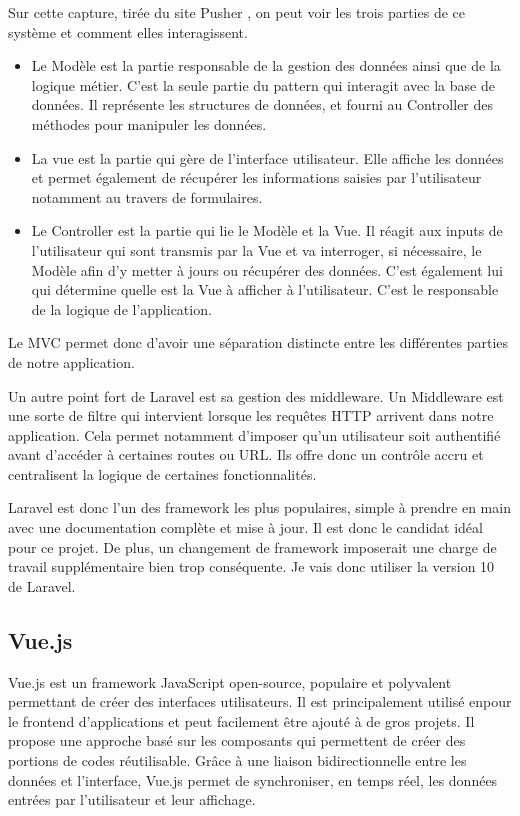 Sur cette capture, tirée du site Pusher \cite{MVC}, on peut voir les trois parties de ce système et comment elles interagissent.
\begin{itemize}
  \item Le Modèle est la partie responsable de la gestion des données ainsi que de la logique métier. C'est la seule partie du pattern qui interagit avec la base de données. Il représente les structures de données, et fourni au Controller des méthodes pour manipuler les données.
  \item La vue est la partie qui gère de l'interface utilisateur. Elle affiche les données et permet également de récupérer les informations saisies par l'utilisateur notamment au travers de formulaires.
  \item Le Controller est la partie qui lie le Modèle et la Vue. Il réagit aux inputs de l'utilisateur qui sont transmis par la Vue et va interroger, si nécessaire, le Modèle afin d'y metter à jours ou récupérer des données. C'est également lui qui détermine quelle est la Vue à afficher à l'utilisateur. C'est le responsable de la logique de l'application.
\end{itemize}
Le MVC permet donc d'avoir une séparation distincte entre les différentes parties de notre application.

Un autre point fort de Laravel est sa gestion des middleware. Un Middleware est une sorte de filtre qui intervient lorsque les requêtes HTTP arrivent dans notre application. Cela permet notamment d'imposer qu'un utilisateur soit authentifié avant d'accéder à certaines routes ou URL. Ils offre donc un contrôle accru et centralisent la logique de certaines fonctionnalités.

Laravel est donc l'un des framework les plus populaires, simple à prendre en main avec une documentation complète et mise à jour. Il est donc le candidat idéal pour ce projet. De plus, un changement de framework imposerait une charge de travail supplémentaire bien trop conséquente.
Je vais donc utiliser la version 10 de Laravel.

\subsection{Vue.js}
Vue.js est un framework JavaScript open-source, populaire et polyvalent permettant de créer des interfaces utilisateurs. Il est principalement utilisé enpour le frontend d'applications et peut facilement être ajouté à de gros projets. Il propose une approche basé sur les composants qui permettent de créer des portions de codes réutilisable. Grâce à une liaison bidirectionnelle entre les données et l'interface, Vue.js permet de synchroniser, en temps réel, les données entrées par l'utilisateur et leur affichage.

